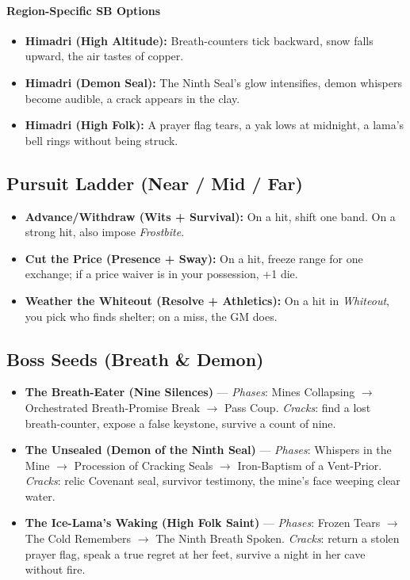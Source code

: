 \paragraph{Region-Specific SB Options}
\begin{itemize}
\item \textbf{Himadri (High Altitude):} Breath-counters tick backward, snow falls upward, the air tastes of copper.
\item \textbf{Himadri (Demon Seal):} The Ninth Seal's glow intensifies, demon whispers become audible, a crack appears in the clay.
\item \textbf{Himadri (High Folk):} A prayer flag tears, a yak lows at midnight, a lama's bell rings without being struck.
\end{itemize}

\subsection*{Pursuit Ladder (Near / Mid / Far)}
\begin{itemize}
\item \textbf{Advance/Withdraw (Wits + Survival):} On a hit, shift one band. On a strong hit, also impose \emph{Frostbite}.
\item \textbf{Cut the Price (Presence + Sway):} On a hit, freeze range for one exchange; if a price waiver is in your possession, +1 die.
\item \textbf{Weather the Whiteout (Resolve + Athletics):} On a hit in \emph{Whiteout}, you pick who finds shelter; on a miss, the GM does.
\end{itemize}

\subsection*{Boss Seeds (Breath \& Demon)}
\begin{itemize}
\item \textbf{The Breath-Eater (Nine Silences)} --- \emph{Phases}: Mines Collapsing $\rightarrow$ Orchestrated Breath-Promise Break $\rightarrow$ Pass Coup. \emph{Cracks}: find a lost breath-counter, expose a false keystone, survive a count of nine.
\item \textbf{The Unsealed (Demon of the Ninth Seal)} --- \emph{Phases}: Whispers in the Mine $\rightarrow$ Procession of Cracking Seals $\rightarrow$ Iron-Baptism of a Vent-Prior. \emph{Cracks}: relic Covenant seal, survivor testimony, the mine's face weeping clear water.
\item \textbf{The Ice-Lama's Waking (High Folk Saint)} --- \emph{Phases}: Frozen Tears $\rightarrow$ The Cold Remembers $\rightarrow$ The Ninth Breath Spoken. \emph{Cracks}: return a stolen prayer flag, speak a true regret at her feet, survive a night in her cave without fire.
\end{itemize}

